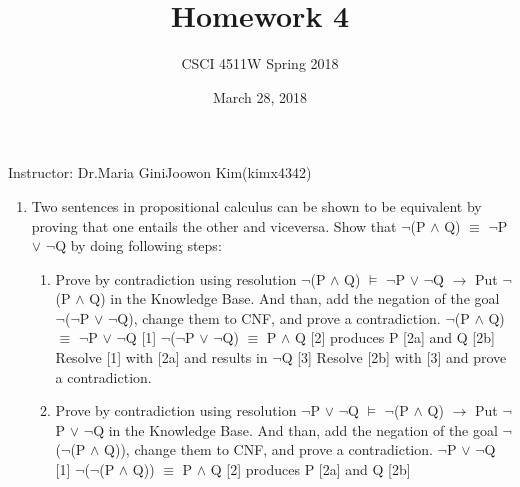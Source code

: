 \documentclass[10pt]{article}
\title{Homework 4}
\author{CSCI 4511W Spring 2018}
\begin{document}
\date{March 28, 2018}
\maketitle

Instructor: Dr.Maria Gini\hfill Joowon Kim(kimx4342)

\hrulefill

\begin{enumerate}
	\item Two sentences in propositional calculus can be shown to be equivalent by proving that one entails the other and viceversa. Show that $\neg$(P $\wedge$ Q) $\equiv$ $\neg$P $\vee$ $\neg$Q by doing following steps:
		\begin{enumerate}
			\item Prove by contradiction using resolution \newline
            $\neg$(P $\wedge$ Q) $\models$ $\neg$P $\vee$ $\neg$Q \newline
            $\rightarrow$ \newline
            Put $\neg$(P $\wedge$ Q) in the Knowledge Base. And than, add the negation of the goal $\neg$($\neg$P $\vee$ $\neg$Q), change them to CNF, and prove a contradiction. \newline
            $\neg$(P $\wedge$ Q) $\equiv$ $\neg$P $\vee$ $\neg$Q [1] \newline
            $\neg$($\neg$P $\vee$ $\neg$Q) $\equiv$ P $\wedge$ Q [2] \newline
            [2] produces P [2a] and Q [2b] \newline
            Resolve [1] with [2a] and results in $\neg$Q [3] \newline
            Resolve [2b] with [3] and prove a contradiction.
            \item Prove by contradiction using resolution \newline
            $\neg$P $\vee$ $\neg$Q $\models$ $\neg$(P $\wedge$ Q) \newline
            $\rightarrow$ \newline
            Put $\neg$P $\vee$ $\neg$Q in the Knowledge Base. And than, add the negation of the goal $\neg$($\neg$(P $\wedge$ Q)), change them to CNF, and prove a contradiction. \newline
            $\neg$P $\vee$ $\neg$Q [1] \newline
            $\neg$($\neg$(P $\wedge$ Q)) $\equiv$ P $\wedge$ Q [2] \newline
            [2] produces P [2a] and Q [2b] \newline

\end{enumerate}
\end{enumerate}
\end{document}
